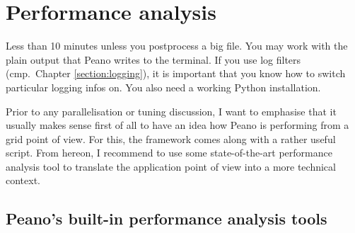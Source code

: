 \section{Performance analysis}
\label{section:performance-analysis}

\chapterDescription
  {
    Less than 10 minutes unless you postprocess a big file.
  }
  {
    You may work with the plain output that Peano writes to the terminal. If you
    use log filters (cmp.~Chapter \ref{section:logging}), it is important that
    you know how to switch particular logging infos on. You also need a working
    Python installation.
  }

\noindent
Prior to any parallelisation or tuning discussion, I want to emphasise that it
usually makes sense first of all to have an idea how Peano is performing from a
grid point of view. For this, the framework comes along with a rather useful script.
From hereon, I recommend to use some state-of-the-art performance analysis tool
to translate the application point of view into a more technical context.

\subsection*{Peano's built-in performance analysis tools}

